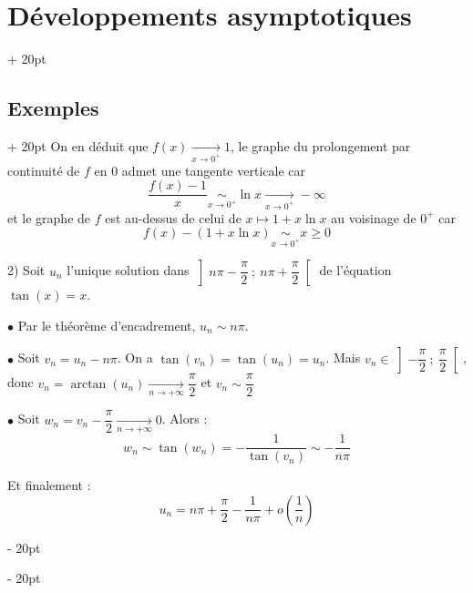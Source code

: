 \documentclass[a4paper, 12pt, twoside]{article}
\newcommand{\lr}[1]{\left( #1 \right)}
\newcommand{\tendsto}[1]{\xrightarrow[#1]{}}
\renewcommand{\ge}{\geqslant}
\newcommand{\ind}[1][20pt]{\advance\leftskip + #1}
\newcommand{\deind}[1][20pt]{\advance\leftskip - #1}
\newenvironment{indt}[2][20pt]{#2 \par \ind[#1]}{\par \deind} %
\begin{document}
\begin{indt}{\section{Développements asymptotiques}}
\begin{indt}{\subsection{Exemples}}
            On en déduit que $f(x) \tendsto{x \to 0^+} 1$, le graphe du prolongement par continuité de $f$ en 0 admet une tangente verticale car
                \[ \dfrac{f(x) - 1}{x} \underset{x \to 0^+}{\sim} \ln x \tendsto{x \to 0^+} -\infty \]
            et  le graphe de $f$ est au-dessus de celui de $x \longmapsto 1 + x\ln x$ au voisinage de $0^+$ car
                \[ f(x) - (1 + x\ln x) \underset{x \to 0^+}{\sim} x \ge 0 \]
            
            \newpage
            
            2) Soit $u_n$ l'unique solution dans $\left] n\pi - \dfrac \pi 2\ ;\ n\pi + \dfrac \pi 2 \right[$ de l'équation $\tan(x) = x$.
            
            $\bullet$ Par le théorème d'encadrement, $\boxed{u_n \sim n\pi}$.
            
            $\bullet$ Soit $v_n = u_n - n\pi$. On a $\tan(v_n) = \tan(u_n) = u_n$. Mais $v_n \in \left] - \dfrac \pi 2\ ;\ \dfrac \pi 2 \right[$, donc $v_n = \arctan(u_n) \tendsto{n \to +\infty} \dfrac \pi 2$ et $\boxed{v_n \sim \dfrac \pi 2}$
            
            $\bullet$ Soit $w_n = v_n - \dfrac \pi 2 \tendsto{n \to +\infty} 0$. Alors :
                \[ w_n \sim \tan(w_n) = -\dfrac{1}{\tan(v_n)} \sim -\dfrac{1}{n\pi} \]
            
            Et finalement :
                \[ \boxed{u_n = n\pi + \dfrac \pi 2 - \dfrac{1}{n\pi} + o\!\lr{\dfrac 1 n}} \]
        \end{indt}
    \end{indt}


    
    
    
\end{document}
